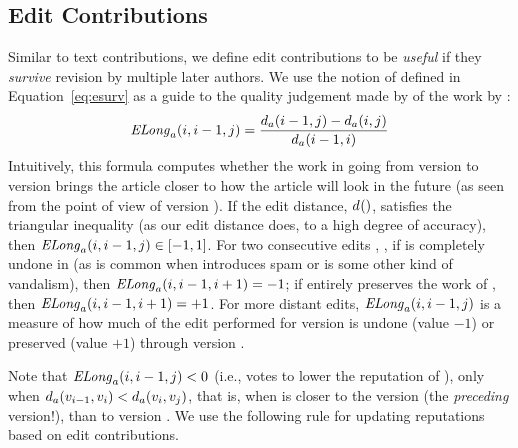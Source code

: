 \subsection{Edit Contributions}

Similar to text contributions, we define edit contributions to
be \textit{useful} if they \textit{survive} revision by multiple
later authors.
We use the notion of  defined in
Equation~\ref{eq:esurv} as a guide to the quality judgement
made by  of the work by :
\begin{equation*}
\mathit{ELong}_{a}(i,i-1,j) = \frac{d_{a}(i-1,j) - d_{a}(i,j)}
                        {d_{a}(i-1,i)}
\end{equation*}
Intuitively, this formula computes whether the work in going
from version  to version  brings the
article closer to how the article will look in the future
(as seen from the point of view of version ).
If the edit distance, $d_{}()$,
satisfies the triangular inequality (as our edit distance
does, to a high degree of accuracy), then $\mathit{ELong}_{a}(i,i-1,j) \in [-1,1]$.  
For two consecutive edits , ,
if  is completely undone in 
(as is common when  introduces spam or is some other
kind of vandalism), then $\mathit{ELong}_{a}(i,i-1,i+1) = -1$; 
if  entirely preserves the work of ,
then $\mathit{ELong}_{a}(i,i-1,i+1) = +1$.
For more distant edits, $\mathit{ELong}_{a}(i,i-1,j)$ is a measure of how much of the
edit performed for version 
is undone (value $-1$) or preserved (value $+1$) through version . 

Note that $\mathit{ELong}_{a}(i,i-1,j) < 0$ (i.e., 
votes to lower the reputation of ), only when
$d_{a}(v_{i-1},v_{i}) < d_{a}(v_{i},v_{j})$,
that is,
when  is closer to the version 
(the \textit{preceding} version!), than to version .
We use the following rule for updating reputations based on
edit contributions.

